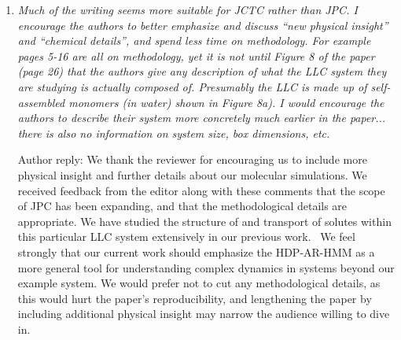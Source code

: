 \documentclass{article}
\begin{document}
\begin{enumerate}[label={Comment \theenumi :}, leftmargin=3.9\parindent]
    
    \item \textit{Much of the writing seems more suitable for JCTC rather than JPC. I encourage the
    authors to better emphasize and discuss “new physical insight” and “chemical details”, and spend
    less time on methodology. For example pages 5-16 are all on methodology, yet it is not until 
    Figure 8 of the paper (page 26) that the authors give any description of what the LLC system 
    they are studying is actually composed of. Presumably the LLC is made up of self-assembled 
    monomers (in water) shown in Figure 8a). I would encourage the authors to describe their 
    system more concretely much earlier in the paper... there is also no information on system 
    size, box dimensions, etc.}
    
    Author reply: We thank the reviewer for encouraging us to include more physical insight and
    further details about our molecular simulations. We received feedback from the editor along 
    with these comments that the scope of JPC has been expanding, and that the methodological 
    details are appropriate. We have studied the structure of and transport of solutes within 
    this particular LLC system extensively in our previous work.~\cite{coscia_chemically_2019}
    We feel strongly that our current work should emphasize the HDP-AR-HMM as a more general 
    tool for understanding complex dynamics in systems beyond our example system. We would prefer
    not to cut any methodological details, as this would hurt the paper's reproducibility, and
    lengthening the paper by including additional physical insight may narrow the audience willing
    to dive in.
    

\end{enumerate}
\end{document}
